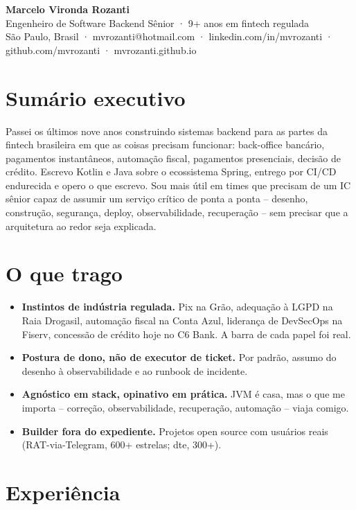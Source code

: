 \documentclass[11pt,a4paper]{article}
\begin{document}
\begin{center}
{\Huge\bfseries Marcelo Vironda Rozanti}\\[4pt]
{\large\color{accent} Engenheiro de Software Backend Sênior · 9+ anos em fintech regulada}\\[3pt]
{\small São Paulo, Brasil · mvrozanti@hotmail.com · linkedin.com/in/mvrozanti · github.com/mvrozanti · mvrozanti.github.io}
\end{center}

\section{Sumário executivo}
Passei os últimos nove anos construindo sistemas backend para as partes da fintech brasileira em que as coisas precisam funcionar: back-office bancário, pagamentos instantâneos, automação fiscal, pagamentos presenciais, decisão de crédito. Escrevo Kotlin e Java sobre o ecossistema Spring, entrego por CI/CD endurecida e opero o que escrevo. Sou mais útil em times que precisam de um IC sênior capaz de assumir um serviço crítico de ponta a ponta -- desenho, construção, segurança, deploy, observabilidade, recuperação -- sem precisar que a arquitetura ao redor seja explicada.

\section{O que trago}
\begin{itemize}
\item \textbf{Instintos de indústria regulada.} Pix na Grão, adequação à LGPD na Raia Drogasil, automação fiscal na Conta Azul, liderança de DevSecOps na Fiserv, concessão de crédito hoje no C6 Bank. A barra de cada papel foi real.
\item \textbf{Postura de dono, não de executor de ticket.} Por padrão, assumo do desenho à observabilidade e ao runbook de incidente.
\item \textbf{Agnóstico em stack, opinativo em prática.} JVM é casa, mas o que me importa -- correção, observabilidade, recuperação, automação -- viaja comigo.
\item \textbf{Builder fora do expediente.} Projetos open source com usuários reais (RAT-via-Telegram, 600+ estrelas; dte, 300+).
\end{itemize}

\section{Experiência}
\end{document}
